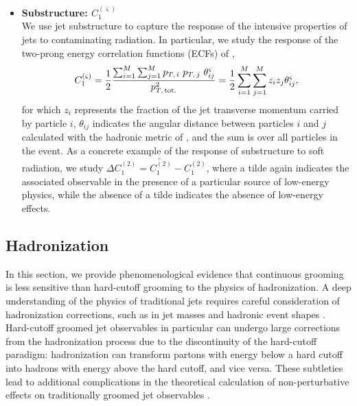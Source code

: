 \begin{itemize}
    \item \textbf{Substructure: \(C_1^{(\varsigma)}\)}
    \\
    We use jet substructure to capture the response of the intensive properties of jets to contaminating radiation.
    In particular, we study the response of the two-prong energy correlation functions (ECFs) of ,
    \begin{equation}
        C_1^{(\varsigma)}
        =
        \frac{1}{2}\frac{\sum_{i=1}^M\sum_{j=1}^M p_{T,\,i}\ p_{T,\,j}\ \theta_{ij}^\varsigma}{p_{T,\,{\rm tot.}}^2}
        =
        \frac{1}{2}\sum_{i=1}^M\sum_{j=1}^M z_i z_j \theta_{ij}^\varsigma
        \label{eqn:ECFdefn}
        ,
    \end{equation}
    for which \(z_i\) represents the fraction of the jet transverse momentum carried by particle \(i\), \(\theta_{ij}\) indicates the angular distance between particles \(i\) and \(j\) calculated with the hadronic metric of , and the sum is over all particles in the event.
    As a concrete example of the response of substructure to soft radiation, we study \(\Delta C_1^{(2)} = \widetilde{C_1^{(2)}} - C_1^{(2)}\), where a tilde again indicates the associated observable in the presence of a particular source of low-energy physics, while the absence of a tilde indicates the absence of low-energy effects.
\end{itemize}


\subsection{Hadronization}
\label{sec:hadronization}

In this section, we provide phenomenological evidence that continuous grooming is less sensitive than hard-cutoff grooming to the physics of hadronization.
%
A deep understanding of the physics of traditional jets requires careful consideration of hadronization corrections, such as in jet masses \cite{Hoang:2019ceu, Marzani:2017kqd, Benkendorfer:2021unv} and hadronic event shapes \cite{Dokshitzer:1995zt, Baron:2020xoi}.
%
Hard-cutoff groomed jet observables in particular can undergo large corrections from the hadronization process due to the discontinuity of the hard-cutoff paradigm:
%
hadronization can transform partons with energy below a hard cutoff into hadrons with energy above the hard cutoff, and vice versa.
%
These subtleties lead to additional complications in the theoretical calculation of non-perturbative effects on traditionally groomed jet observables \cite{Hoang:2019ceu}.

